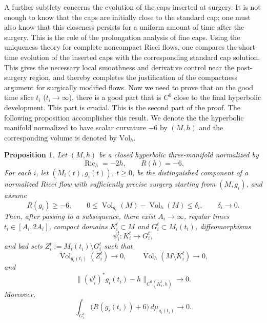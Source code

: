\documentclass{amsart}
\newtheorem{proposition}{Proposition}[section]
\begin{document}
\noindent A further subtlety concerns the evolution of the caps inserted at surgery.  It
is not enough to know that the caps are initially close to the standard cap; one
must also know that this closeness persists for a uniform amount of time after
the surgery.  This is the role of the prolongation analysis of fine caps.  Using
the uniqueness theory for complete noncompact Ricci flows, one compares the
short-time evolution of the inserted caps with the corresponding standard cap
solution.  This gives the necessary local smoothness and derivative control near
the post-surgery region, and thereby completes the justification of the
compactness argument for surgically modified flows.
\noindent  Now we need to prove that on the good time slice $t_{i}$ ($t_{i}\to\infty$), there is a good part that is $C^{0}$ close to the final hyperbolic development. This part is crucial. This is the second part of the proof. The following proposition accomplishes this result. 
We denote the the hyperbolic manifold normalized to have scalar curvature $-6$ by $(M,h)$ and the corresponding volume is denoted by $\text{Vol}_{h}$.






\begin{proposition}
\label{prop:entropy-good-time-c0-hyperbolic-borel}
Let \((M,h)\) be a closed hyperbolic three-manifold normalized by
\[
        \operatorname{Ric}_h=-2h,
        \qquad
        R(h)=-6.
\]
For each \(i\), let \((M_i(t),g_i(t))\), \(t\geq0\), be the distinguished
component of a normalized Ricci flow with sufficiently precise surgery
starting from \((M,g_i)\), and assume
\[
        R(g_i)\geq-6,
        \qquad
        0\leq\operatorname{Vol}_{g_i}(M)-\operatorname{Vol}_h(M)
        \leq\delta_i,
        \qquad
        \delta_i\to0.
\]
Then, after passing to a subsequence, there exist \(A_i\to\infty\),
regular times
$ t_i\in[A_i,2A_i]$,
compact domains \(K_i^t\subset M\) and \(G_i^t\subset M_i(t_i)\),
diffeomorphisms
\[
        \psi_i^t:K_i^t\longrightarrow G_i^t,
\]
and bad sets \(Z_i^t:=M_i(t_i)\setminus G_i^t\) such that
\[
        \operatorname{Vol}_{g_i(t_i)}(Z_i^t)\to0,
        \qquad
        \operatorname{Vol}_h(M\setminus K_i^t)\to0,
\]
and
\[
        \|(\psi_i^t)^*g_i(t_i)-h\|_{C^0(K_i^t,h)}\to0.
\]
Moreover,
\[
        \int_{G_i^t}
        \bigl(R(g_i(t_i))+6\bigr)\,d\mu_{g_i(t_i)}
        \to0.
\]
\end{proposition}
\end{document}
